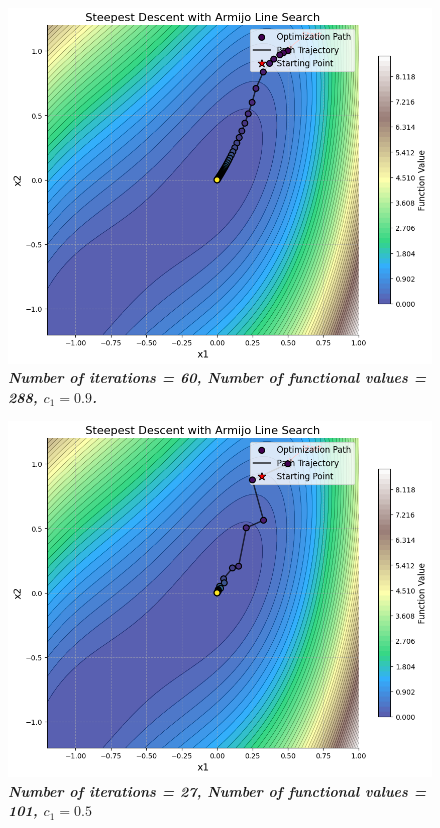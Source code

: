 \documentclass{article}
\begin{document}
\begin{figure}[H]
    \centering
    \includegraphics[width=1\textwidth]{Lab2_2.png}
    \caption{\textbf{\textit{Number of iterations = 60, Number of functional values = 288, $c_1 = 0.9$.}}}
    \label{lab22}
\end{figure}

\begin{figure}[H]
    \centering
    \includegraphics[width=1\textwidth]{Lab2_3.png}
    \caption{\textbf{\textit{Number of iterations = 27, Number of functional values = 101, $c_1 = 0.5$ }}}
    \label{lab23}
\end{figure}
\end{document}

